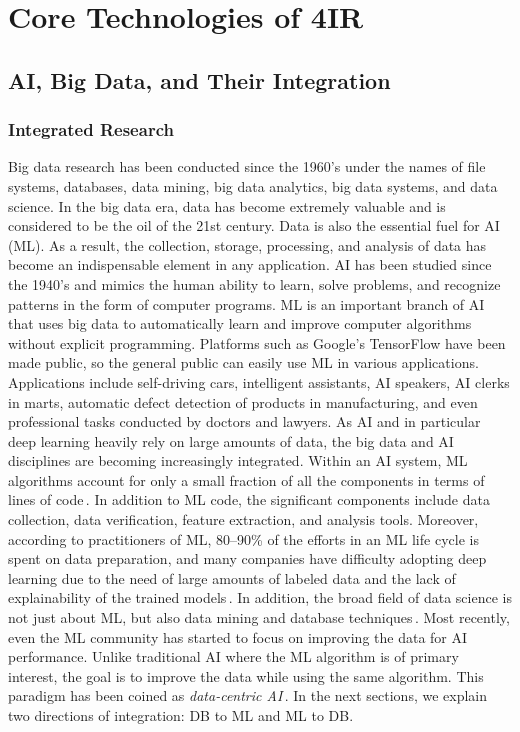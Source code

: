 \documentclass[11pt]{article}
\begin{document}
\section{Core Technologies of 4IR}

\subsection{AI, Big Data, and Their Integration}

\subsubsection{Integrated Research}
Big data research has been conducted since the 1960’s under the names of file systems, databases, data mining, big data analytics, big data systems, and data science. In the big data era, data has become extremely valuable and is considered to be the oil of the 21st century. Data is also the essential fuel for AI\,(ML). As a result, the collection, storage, processing, and analysis of data has become an indispensable element in any application. AI has been studied since the 1940’s and mimics the human ability to learn, solve problems, and recognize patterns in the form of computer programs. ML is an important branch of AI that uses big data to automatically learn and improve computer algorithms without explicit programming. Platforms such as Google’s TensorFlow have been made public, so the general public can easily use ML in various applications. Applications include self-driving cars, intelligent assistants, AI speakers, AI clerks in marts, automatic defect detection of products in manufacturing, and even professional tasks conducted by doctors and lawyers.
As AI and in particular deep learning heavily rely on large amounts of data, the big data and AI disciplines are becoming increasingly integrated. Within an AI system, ML algorithms account for only a small fraction of all the components in terms of lines of code\,\cite{DBLP:conf/nips/SculleyHGDPECYC15}. In addition to ML code, the significant components include data collection, data verification, feature extraction, and analysis tools. Moreover, according to practitioners of ML, 80--90\% of the efforts in an ML life cycle is spent on data preparation, and many companies have difficulty adopting deep learning due to the need of large amounts of labeled data and the lack of explainability of the trained models\,\cite{DBLP:journals/debu/StonebrakerR19}. In addition, the broad field of data science is not just about ML, but also data mining and database techniques\,\cite{DBLP:journals/debu/Ullman20}. Most recently, even the ML community has started to focus on improving the data for AI performance. Unlike traditional AI where the ML algorithm is of primary interest, the goal is to improve the data while using the same algorithm. This paradigm has been coined as \emph{data-centric AI}\,\cite{data-centric-ai}. In the next sections, we explain two directions of integration: DB to ML and ML to DB.
\end{document}
